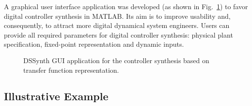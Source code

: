 \documentclass[10pt,conference]{IEEEtran}
\begin{document}
A graphical user interface application was developed (as shown in Fig.~\ref{fig:gui-for-tf}) 
to favor digital controller synthesis in MATLAB. Its aim is to improve usability and, 
consequently, to attract more digital dynamical system engineers. Users can provide all 
required parameters for digital controller synthesis: physical plant specification, 
fixed-point representation and dynamic inputs. 
%
\begin{figure}[ht]
    \centering
		\hfil
		\hfil
		\hfil
		\hfil
    \caption{DSSynth GUI application for the controller synthesis based on transfer function representation.}
    \label{fig:gui-for-tf}
\end{figure}

\subsection{Illustrative Example}
\end{document}
